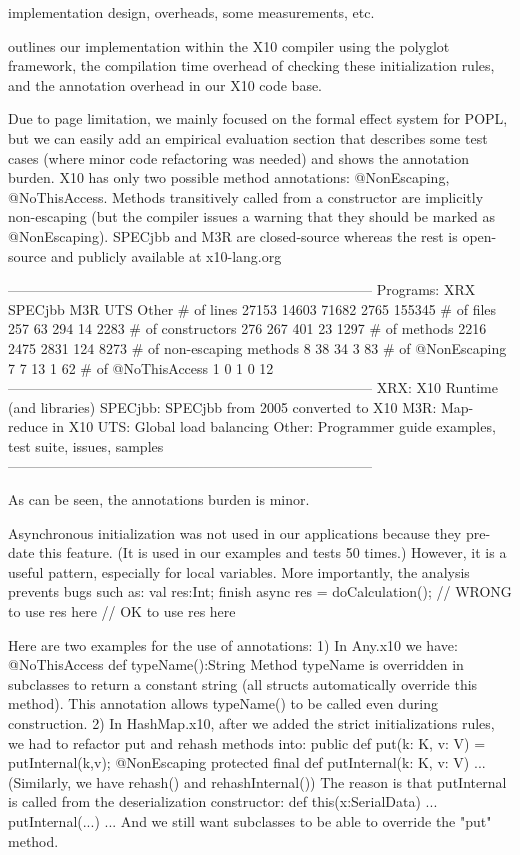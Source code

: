 implementation design, overheads, some measurements, etc.

outlines our implementation within the X10 compiler using the polyglot framework,
    the compilation time overhead of checking these initialization rules,
    and the annotation overhead in our X10 code base.


Due to page limitation, we mainly focused on the formal effect system for POPL,
but we can easily add an empirical evaluation section that describes some test cases (where minor code refactoring was needed) and shows the annotation burden.
X10 has only two possible method annotations: @NonEscaping, @NoThisAccess.
Methods transitively called from a constructor are implicitly non-escaping (but the compiler issues a warning that they should be marked as @NonEscaping).
SPECjbb and M3R are closed-source whereas the rest is open-source and publicly available at x10-lang.org

------------------------------------------------------------------------------
Programs:           XRX SPECjbb     M3R UTS Other
# of lines          27153   14603       71682   2765    155345
# of files          257 63      294 14  2283
# of constructors       276 267     401 23  1297
# of methods            2216    2475        2831    124 8273
# of non-escaping methods   8   38      34  3   83
# of @NonEscaping       7   7       13  1   62
# of @NoThisAccess      1   0       1   0   12
------------------------------------------------------------------------------
XRX: X10 Runtime (and libraries)
SPECjbb: SPECjbb from 2005 converted to X10
M3R: Map-reduce in X10
UTS: Global load balancing
Other: Programmer guide examples, test suite, issues, samples
------------------------------------------------------------------------------

As can be seen, the annotations burden is minor.

Asynchronous initialization was not used in our applications because they pre-date this feature.
(It is used in our examples and tests 50 times.)
However, it is a useful pattern, especially for local variables.
More importantly, the analysis prevents bugs such as:
val res:Int;
finish {
  async {
    res = doCalculation();
  }
  // WRONG to use res here
}
// OK to use res here

Here are two examples for the use of annotations:
1) In Any.x10 we have:
@NoThisAccess def typeName():String
Method typeName is overridden in subclasses to return a constant string (all structs automatically override this method).
This annotation allows typeName() to be called even during construction.
2) In HashMap.x10, after we added the strict initializations rules, we had to refactor put and rehash methods into:
public def put(k: K, v: V) = putInternal(k,v);
@NonEscaping protected final def putInternal(k: K, v: V) {...}
(Similarly, we have rehash() and rehashInternal())
The reason is that putInternal is called from the deserialization constructor:
def this(x:SerialData) { ... putInternal(...) ... }
And we still want subclasses to be able to override the "put" method.

